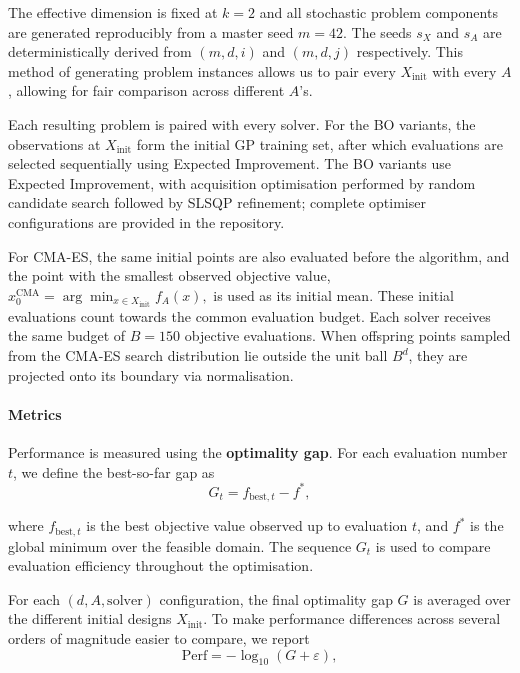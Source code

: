 \documentclass[10pt]{article}
\begin{document}
The effective dimension is fixed at $k=2$ and all stochastic problem components are generated reproducibly from a master seed $m=42$. The seeds $s_X$ and $s_A$ are deterministically derived from $(m,d,i)$ and $(m,d,j)$ respectively. This method of generating problem instances allows us to pair every $X_\mathrm{init}$ with every $A$, allowing for fair comparison across different $A$'s.

Each resulting problem is paired with every solver. For the BO variants, the observations at $X_{\mathrm{init}}$ form the initial GP training set, after which evaluations are selected sequentially using Expected Improvement. The BO variants use Expected Improvement, with acquisition optimisation performed by random candidate search followed by SLSQP refinement; complete optimiser configurations are provided in the repository. 

For CMA-ES, the same initial points are also evaluated before the algorithm, and the point with the smallest observed objective value, 
$
    x_0^{\mathrm{CMA}}
    =
    \arg\min_{x\in X_{\mathrm{init}}} f_A(x),
$
is used as its initial mean. These initial evaluations count towards the common evaluation budget. Each solver receives the same budget of
$
    B=150
$
objective evaluations. When offspring points sampled from the CMA-ES search distribution lie outside the unit ball $B^d$, they are projected onto its boundary via normalisation.

\paragraph{Metrics}
Performance is measured using the \textbf{optimality gap}. For each evaluation number $t$, we define the best-so-far gap as
\begin{equation}
    G_t = f_{\mathrm{best},t} - f^*,
\end{equation}

where $f_{\mathrm{best},t}$ is the best objective value observed up to evaluation $t$, and $f^*$ is the global minimum over the feasible domain. The sequence $G_t$ is used to compare evaluation efficiency throughout the optimisation.

For each $(d,A,\text{solver})$ configuration, the final optimality gap $G$ is averaged over the different initial designs $X_{\mathrm{init}}$. To make performance differences across several orders of magnitude easier to compare, we report
\begin{equation}
    \mathrm{Perf}
    =
    -\log_{10}(G+\varepsilon),
\end{equation}
\end{document}
